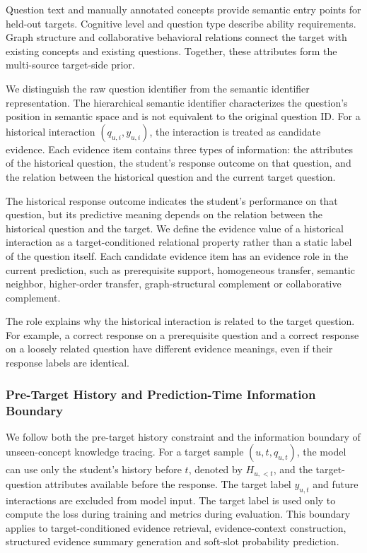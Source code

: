\documentclass[a4paper,12pt]{article}
\numberwithin{table}{section}
\begin{document}
Question text and manually annotated concepts provide semantic entry points for held-out targets. Cognitive level and question type describe ability requirements. Graph structure and collaborative behavioral relations connect the target with existing concepts and existing questions. Together, these attributes form the multi-source target-side prior.

We distinguish the raw question identifier from the semantic identifier representation. The hierarchical semantic identifier characterizes the question's position in semantic space and is not equivalent to the original question ID. For a historical interaction \((q_{u,i},y_{u,i})\), the interaction is treated as candidate evidence. Each evidence item contains three types of information: the attributes of the historical question, the student's response outcome on that question, and the relation between the historical question and the current target question.

The historical response outcome indicates the student's performance on that question, but its predictive meaning depends on the relation between the historical question and the target. We define the evidence value of a historical interaction as a target-conditioned relational property rather than a static label of the question itself. Each candidate evidence item has an evidence role in the current prediction, such as prerequisite support, homogeneous transfer, semantic neighbor, higher-order transfer, graph-structural complement or collaborative complement.

The role explains why the historical interaction is related to the target question. For example, a correct response on a prerequisite question and a correct response on a loosely related question have different evidence meanings, even if their response labels are identical.

\subsubsection{Pre-Target History and Prediction-Time Information Boundary}

We follow both the pre-target history constraint and the information boundary of unseen-concept knowledge tracing. For a target sample \((u,t,q_{u,t})\), the model can use only the student's history before \(t\), denoted by \(H_{u,<t}\), and the target-question attributes available before the response. The target label \(y_{u,t}\) and future interactions are excluded from model input. The target label is used only to compute the loss during training and metrics during evaluation. This boundary applies to target-conditioned evidence retrieval, evidence-context construction, structured evidence summary generation and soft-slot probability prediction.
\end{document}
